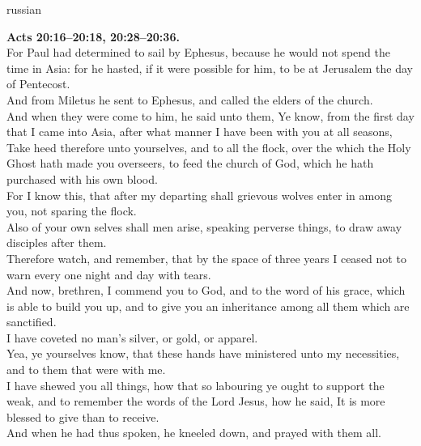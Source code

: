 \documentclass[10pt]{article} %
\begin{document}
{\begin{minipage}[t]{0.45\textwidth}
\begin{otherlanguage*}{russian}
\end{otherlanguage*}
\end{minipage}
\hfill
\begin{minipage}[t]{0.45\textwidth}

\textbf{Acts 20:16--20:18, 20:28--20:36.}\\
For Paul had determined to sail by Ephesus, because he would not spend the time in Asia: for he hasted, if it were possible for him, to be at Jerusalem the day of Pentecost.\\
And from Miletus he sent to Ephesus, and called the elders of the church.\\
And when they were come to him, he said unto them, Ye know, from the first day that I came into Asia, after what manner I have been with you at all seasons,\\
Take heed therefore unto yourselves, and to all the flock, over the which the Holy Ghost hath made you overseers, to feed the church of God, which he hath purchased with his own blood.\\
For I know this, that after my departing shall grievous wolves enter in among you, not sparing the flock.\\
Also of your own selves shall men arise, speaking perverse things, to draw away disciples after them.\\
Therefore watch, and remember, that by the space of three years I ceased not to warn every one night and day with tears.\\
And now, brethren, I commend you to God, and to the word of his grace, which is able to build you up, and to give you an inheritance among all them which are sanctified.\\
I have coveted no man's silver, or gold, or apparel.\\
Yea, ye yourselves know, that these hands have ministered unto my necessities, and to them that were with me.\\
I have shewed you all things, how that so labouring ye ought to support the weak, and to remember the words of the Lord Jesus, how he said, It is more blessed to give than to receive.\\
And when he had thus spoken, he kneeled down, and prayed with them all.\\

\end{minipage}}
\vspace*{\fill}
\newpage
\Huge%
\vspace*{\fill}
\end{document}
